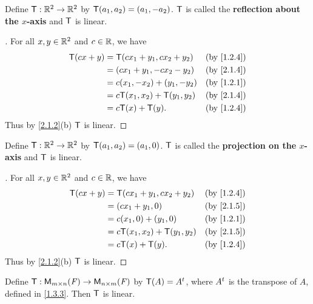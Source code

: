 \begin{eg}\label{2.1.4}
	Define \(\mathsf{T} : \mathbb{R}^2 \to \mathbb{R}^2\) by \(\mathsf{T}(a_1, a_2) = (a_1, -a_2)\).
	\(\mathsf{T}\) is called the \textbf{reflection about the \(x\)-axis} and \(\mathsf{T}\) is linear.
\end{eg}

\begin{proof}[]
	For all \(x, y \in \mathbb{R}^2\) and \(c \in \mathbb{R}\), we have
	\begin{align*}
		\T(cx + y) & = \T(cx_1 + y_1, cx_2 + y_2)   &  & \by{1.2.4} \\
		           & = (cx_1 + y_1, -cx_2 - y_2)    &  & \by{2.1.4} \\
		           & = c(x_1, -x_2) + (y_1, -y_2)   &  & \by{1.2.1} \\
		           & = c\T(x_1, x_2) + \T(y_1, y_2) &  & \by{2.1.4} \\
		           & = c\T(x) + \T(y).              &  & \by{1.2.4}
	\end{align*}
	Thus by \cref{2.1.2}(b) \(\mathsf{T}\) is linear.
\end{proof}

\begin{eg}\label{2.1.5}
	Define \(\mathsf{T} : \mathbb{R}^2 \to \mathbb{R}^2\) by \(\mathsf{T}(a_1, a_2) = (a_1, 0)\).
	\(\mathsf{T}\) is called the \textbf{projection on the \(x\)-axis} and \(\mathsf{T}\) is linear.
\end{eg}

\begin{proof}[]
	For all \(x, y \in \mathbb{R}^2\) and \(c \in \mathbb{R}\), we have
	\begin{align*}
		\T(cx + y) & = \T(cx_1 + y_1, cx_2 + y_2)   &  & \by{1.2.4} \\
		           & = (cx_1 + y_1, 0)              &  & \by{2.1.5} \\
		           & = c(x_1, 0) + (y_1, 0)         &  & \by{1.2.1} \\
		           & = c\T(x_1, x_2) + \T(y_1, y_2) &  & \by{2.1.5} \\
		           & = c\T(x) + \T(y).              &  & \by{1.2.4}
	\end{align*}
	Thus by \cref{2.1.2}(b) \(\mathsf{T}\) is linear.
\end{proof}

\begin{eg}\label{2.1.6}
	Define \(\T : \ms[m][n][\F] \to \ms[n][m][\F]\) by \(\mathsf{T}(A) = {A}^{t}\), where \({A}^{t}\) is the transpose of \(A\), defined in \cref{1.3.3}.
	Then \(\mathsf{T}\) is linear.
\end{eg}

